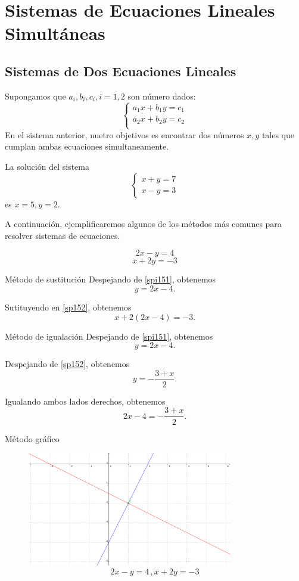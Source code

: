 
\section{Sistemas de Ecuaciones Lineales Simultáneas}

\subsection{Sistemas de Dos Ecuaciones Lineales}

 Supongamos que $a_{i}, b_{i}, c_{i}, i=1,2$ son número dados:
	$$\begin{cases}
		a_{1}x+b_{1}y=c_{1}\\
		a_{2}x+b_{2}y=c_{2}\\
	\end{cases}
	$$
	En el sistema anterior, nuetro objetivos es encontrar dos números $x,y$ tales que cumplan ambas ecuaciones simultaneamente.



	\begin{problema}
		La soluci\'on del sistema 
		$$\begin{cases}
			x+y=7\\
			x-y=3
		\end{cases}
		$$ es $x=5,y=2.$
	\end{problema}
	



	A continuaci\'on, ejemplificaremos algunos de los m\'etodos más comunes para resolver sistemas de ecuaciones.

%

\[
	\label{spi151}
	2x-y=4
\]
\[	
	\label{spi152}
	x+2y=-3
\]		

	


{M\'etodo de sustituci\'on} 
	Despejando de \eqref{spi151}, obtenemos
	$$y=2x-4.$$
	
	Sutituyendo en \eqref{sp152}, obtenemos
	$$
	x+2(2x-4)=-3.
	$$
	


{M\'etodo de igualaci\'on}
	Despejando de \eqref{spi151}, obtenemos
	$$y=2x-4.$$
	
	Despejando de \eqref{sp152}, obtenemos
	$$y=-\dfrac{3+x}{2}.$$
	
	Igualando ambos lados derechos, obtenemos
	$$
	2x-4=-\dfrac{3+x}{2}.
	$$



{M\'etodo gráfico}
	\begin{figure}
		\centering
		\includegraphics[height=5cm,keepaspectratio=true]{./precalculo/IM0401.png}
		\caption{$$2x-y=4\, , x+2y=-3$$}
		\label{fig:IM0401}
	\end{figure}
	


